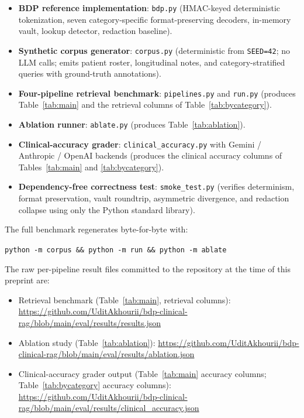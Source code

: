 \documentclass[11pt,a4paper]{article}
\begin{document}
\begin{itemize}
  \item \textbf{BDP reference implementation}: \texttt{bdp.py}
        (HMAC-keyed deterministic tokenization, seven category-specific
        format-preserving decoders, in-memory vault, lookup detector,
        redaction baseline).
  \item \textbf{Synthetic corpus generator}: \texttt{corpus.py}
        (deterministic from \texttt{SEED=42}; no LLM calls; emits patient
        roster, longitudinal notes, and category-stratified queries with
        ground-truth annotations).
  \item \textbf{Four-pipeline retrieval benchmark}: \texttt{pipelines.py}
        and \texttt{run.py} (produces Table~\ref{tab:main} and the
        retrieval columns of Table~\ref{tab:bycategory}).
  \item \textbf{Ablation runner}: \texttt{ablate.py} (produces
        Table~\ref{tab:ablation}).
  \item \textbf{Clinical-accuracy grader}: \texttt{clinical\_accuracy.py}
        with Gemini / Anthropic / OpenAI backends (produces the clinical
        accuracy columns of Tables~\ref{tab:main} and
        \ref{tab:bycategory}).
  \item \textbf{Dependency-free correctness test}: \texttt{smoke\_test.py}
        (verifies determinism, format preservation, vault roundtrip,
        asymmetric divergence, and redaction collapse using only the
        Python standard library).
\end{itemize}

The full benchmark regenerates byte-for-byte with:

\begin{center}
\texttt{python -m corpus \&\& python -m run \&\& python -m ablate}
\end{center}

The raw per-pipeline result files committed to the repository at the time
of this preprint are:

\begin{itemize}
  \item Retrieval benchmark (Table~\ref{tab:main}, retrieval columns):
        \url{https://github.com/UditAkhourii/bdp-clinical-rag/blob/main/eval/results/results.json}
  \item Ablation study (Table~\ref{tab:ablation}):
        \url{https://github.com/UditAkhourii/bdp-clinical-rag/blob/main/eval/results/ablation.json}
  \item Clinical-accuracy grader output (Table~\ref{tab:main} accuracy
        columns; Table~\ref{tab:bycategory} accuracy columns):
        \url{https://github.com/UditAkhourii/bdp-clinical-rag/blob/main/eval/results/clinical_accuracy.json}
\end{itemize}
\end{document}
